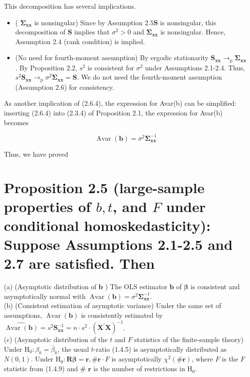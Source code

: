 \documentclass[10pt]{article}
\begin{document}
This decomposition has several implications.

\begin{itemize}
  \item ( $\boldsymbol{\Sigma}_{\mathbf{x x}}$ is nonsingular) Since by Assumption $2.5 \mathbf{S}$ is nonsingular, this decomposition of $\mathbf{S}$ implies that $\sigma^{2}>0$ and $\boldsymbol{\Sigma}_{\mathbf{x x}}$ is nonsingular. Hence, Assumption 2.4 (rank condition) is implied.
  \item (No need for fourth-moment assumption) By ergodic stationarity $\mathbf{S}_{\mathbf{x x}} \rightarrow_{\mathrm{p}} \boldsymbol{\Sigma}_{\mathbf{x x}}$. By Proposition 2.2, $s^{2}$ is consistent for $\sigma^{2}$ under Assumptions 2.1-2.4. Thus, $s^{2} \mathbf{S}_{\mathbf{x x}} \rightarrow_{\mathrm{p}} \sigma^{2} \boldsymbol{\Sigma}_{\mathbf{x x}}=\mathbf{S}$. We do not need the fourth-moment assumption (Assumption 2.6) for consistency.
\end{itemize}

As another implication of (2.6.4), the expression for Avar(b) can be simplified: inserting (2.6.4) into (2.3.4) of Proposition 2.1, the expression for Avar(b) becomes


\begin{equation*}
\operatorname{Avar}(\mathbf{b})=\sigma^{2} \boldsymbol{\Sigma}_{\mathbf{x x}}^{-1} \tag{2.6.5}
\end{equation*}


Thus, we have proved

\section*{Proposition 2.5 (large-sample properties of $b, t$, and $F$ under conditional homoskedasticity): Suppose Assumptions 2.1-2.5 and 2.7 are satisfied. Then}
(a) (Asymptotic distribution of $\mathbf{b}$ ) The OLS estimator $\mathbf{b}$ of $\boldsymbol{\beta}$ is consistent and asymptotically normal with $\operatorname{Avar}(\mathbf{b})=\sigma^{2} \boldsymbol{\Sigma}_{\mathbf{x x}}^{-1}$.\\
(b) (Consistent estimation of asymptotic variance) Under the same set of assumptions, $\operatorname{Avar}(\mathbf{b})$ is consistently estimated by $\widehat{\operatorname{Avar}(\mathbf{b})}=s^{2} \mathbf{S}_{\mathbf{x x}}^{-1}=n \cdot s^{2} \cdot\left(\mathbf{X}^{\prime} \mathbf{X}\right)^{-1}$.\\
(c) (Asymptotic distribution of the $t$ and $F$ statistics of the finite-sample theory) Under $\mathrm{H}_{0}: \beta_{k}=\bar{\beta}_{k}$, the usual $t$-ratio (1.4.5) is asymptotically distributed as $N(0,1)$. Under $\mathrm{H}_{0}: \mathbf{R} \boldsymbol{\beta}=\mathbf{r}, \# \mathbf{r} \cdot F$ is asymptotically $\chi^{2}(\# \mathbf{r})$, where $F$ is the $F$ statistic from (1.4.9) and \# $\mathbf{r}$ is the number of restrictions in $\mathrm{H}_{0}$.
\end{document}
